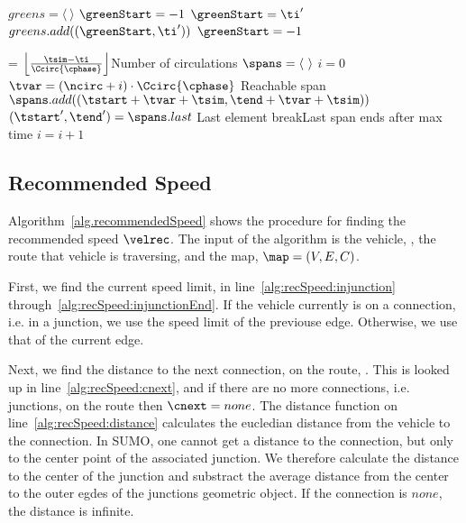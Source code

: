 \begin{algorithm}
\caption{$getSpans(\con, \ti)$}\label{alg.getSpans}
\begin{algorithmic}[1]
\State $greens = \langle\ \rangle$
\State $\greenStart = -1$
\label{alg:getSpans:GreensFor}
\label{alg:getSpans:GreenBegin}
\State $\greenStart = \ti'$
\label{alg:getSpans:GreenEnd}
\State $greens.add((\greenStart, \ti'))$
\State $\greenStart=-1$
\EndIf
\EndFor\label{alg:getSpans:GreensEnd}

\State \ncirc = $\left \lfloor \frac{\tsim-\ti}{\Ccirc{\cphase}} \right \rfloor$\Comment Number of circulations\label{alg:getSpans:ncirc}
\State $\spans = \langle\ \rangle$\label{alg:getSpans:initSpans}
\State $i = 0$\label{alg:getSpans:i}
\label{alg:getSpans:whilebegin}
\label{alg:getSpans:forbegin}
\State $\tvar = (\ncirc+i)\cdot \Ccirc{\cphase}$\label{alg:getSpans:tvar}
\If {$\tend+\tvar> \tsim-\ti$}\Comment Reachable span
\State $\spans.add((\tstart + \tvar+\tsim, \tend + \tvar+ \tsim))$\label{alg:getSpans:add}
\EndIf
\EndFor
\State $(\tstart',\tend') = \spans.last$ \Comment Last element
\label{alg:getSpans:breakCond}
\State break\Comment Last span ends after max time
\EndIf
\State $i=i+1$
\EndWhile
\State\Return \spans
\end{algorithmic}
\end{algorithm}



\subsection{Recommended Speed}
Algorithm~\ref{alg.recommendedSpeed} shows the procedure for finding the recommended speed $\velrec$.
The input of the algorithm is the vehicle, \veh, the route that vehicle is traversing, \route and the map, $\map = (V, E, C)$.

First, we find the current speed limit, \velmax in line~\ref{alg:recSpeed:injunction} through~\ref{alg:recSpeed:injunctionEnd}. %
If the vehicle currently is on a connection, i.e. in a junction, we use the speed limit of the previouse edge.
Otherwise, we use that of the current edge.

Next, we find the distance to the next connection, \cnext on the route, \route. 
This is looked up in line~\ref{alg:recSpeed:cnext}, and if there are no more connections, i.e. junctions, on the route then $\cnext=none$.
The distance function on line~\ref{alg:recSpeed:distance} calculates the eucledian distance from the vehicle to the connection.
In SUMO, one cannot get a distance to the connection, but only to the center point of the associated junction.
We therefore calculate the distance to the center of the junction and substract the average distance from the center to the outer egdes of the junctions geometric object. %
If the connection is $none$, the distance is infinite.

